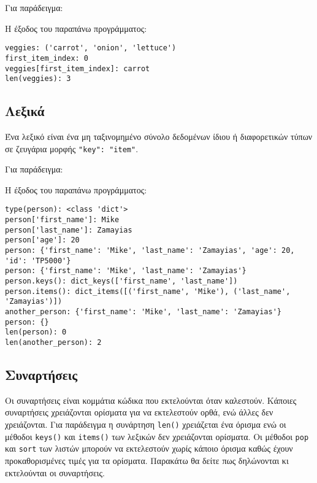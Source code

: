 \documentclass[14pt]{extreport}
\begin{document}
Για παράδειγμα:



Η έξοδος του παραπάνω προγράμματος:

\begin{lstlisting}[language={}]
veggies: ('carrot', 'onion', 'lettuce')
first_item_index: 0
veggies[first_item_index]: carrot
len(veggies): 3
\end{lstlisting}



\newpage
\subsection{Λεξικά}
Ένα λεξικό είναι ένα μη ταξινομημένο σύνολο δεδομένων ίδιου ή διαφορετικών τύπων σε ζευγάρια μορφής \lstinline{"key": "item"}.

Για παράδειγμα:



Η έξοδος του παραπάνω προγράμματος:

\begin{lstlisting}[language={}]
type(person): <class 'dict'>
person['first_name']: Mike
person['last_name']: Zamayias
person['age']: 20
person: {'first_name': 'Mike', 'last_name': 'Zamayias', 'age': 20, 'id': 'TP5000'}
person: {'first_name': 'Mike', 'last_name': 'Zamayias'}
person.keys(): dict_keys(['first_name', 'last_name'])
person.items(): dict_items([('first_name', 'Mike'), ('last_name', 'Zamayias')])
another_person: {'first_name': 'Mike', 'last_name': 'Zamayias'}
person: {}
len(person): 0
len(another_person): 2
\end{lstlisting}

\newpage

\subsection{Συναρτήσεις}
Οι συναρτήσεις είναι κομμάτια κώδικα που εκτελούνται όταν καλεστούν. Κάποιες συναρτήσεις χρειάζονται ορίσματα για να εκτελεστούν ορθά, ενώ άλλες δεν χρειάζονται. Για παράδειγμα η συνάρτηση \lstinline{len()} χρειάζεται ένα όρισμα ενώ οι μέθοδοι \lstinline{keys()} και \lstinline{items()} των λεξικών δεν χρειάζονται ορίσματα. Οι μέθοδοι \lstinline{pop} και \lstinline{sort} των λιστών μπορούν να εκτελεστούν χωρίς κάποιο όρισμα καθώς έχουν προκαθορισμένες τιμές για τα ορίσματα. Παρακάτω θα δείτε πως δηλώνονται κι εκτελούνται οι συναρτήσεις.


\end{document}

